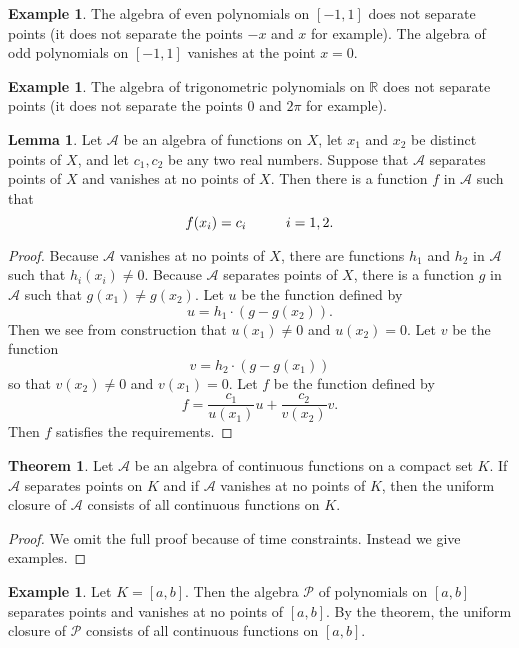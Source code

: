 \documentclass[12pt]{article}
\theoremstyle{definition}
\newtheorem{example}[definition]{Example}
\theoremstyle{theorem}
\newtheorem{theorem}[definition]{Theorem}
\newtheorem{lemma}[definition]{Lemma}
\begin{document}
\begin{example}
The algebra of even polynomials on $[-1,1]$ does not separate points (it does not separate the points $-x$ and $x$ for example). The algebra of odd polynomials on $[-1,1]$ vanishes at the point $x = 0$.  
\end{example}

\begin{example}
The algebra of trigonometric polynomials on $\mathbb{R}$ does not separate points (it does not separate the points $0$ and $2\pi$ for example). 
\end{example}

\begin{lemma}
Let $\mathcal{A}$ be an algebra of functions on $X$, let $x_1$ and $x_2$ be distinct points of $X$, and let $c_1, c_2$ be any two real numbers. Suppose that $\mathcal{A}$ separates points of $X$ and vanishes at no points of $X$. Then there is a function $f$ in $\mathcal{A}$ such that  
\[
f(x_i) = c_i \hspace{10mm} i=1,2.
\]
\end{lemma}

\begin{proof}
Because $\mathcal{A}$ vanishes at no points of $X$, there are functions $h_1$ and $h_2$ in $\mathcal{A}$ such that $h_i(x_i) \ne 0$. Because $\mathcal{A}$ separates points of $X$, there is a function $g$ in $\mathcal{A}$ such that $g(x_1) \ne g(x_2)$. Let $u$ be the function defined by 
\[
u = h_1 \cdot (g - g(x_2)).
\]
Then we see from construction that $u(x_1) \ne 0$ and $u(x_2) = 0.$ Let $v$ be the function 
\[
v = h_2 \cdot(g - g(x_1))
\]
so that $v(x_2) \ne 0$ and $v(x_1) = 0$. Let $f$ be the function defined by 
\[
f = \frac{c_1 }{u(x_1)} u + \frac{c_2 }{v(x_2)} v.
\]
Then $f$ satisfies the requirements. 
\end{proof}

\begin{theorem}
Let $\mathcal{A}$ be an algebra of continuous functions on a compact set $K$. If $\mathcal{A}$ separates points on $K$ and if $\mathcal{A}$ vanishes at no points of $K$, then the uniform closure of $\mathcal{A}$ consists of all continuous functions on $K$. 
\end{theorem}

\begin{proof}
We omit the full proof because of time constraints. Instead we give examples.
\end{proof}


\begin{example}
Let $K = [a,b]$. Then the algebra $\mathcal{P}$ of polynomials on $[a,b]$ separates points and vanishes at no points of $[a,b]$. By the theorem, the uniform closure of $\mathcal{P}$ consists of all continuous functions on $[a,b]$. 
\end{example}
\end{document}
